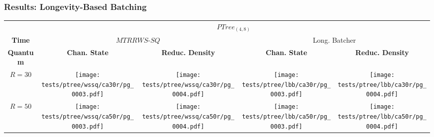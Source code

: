 \begin{slide}
\frametitle{Results: Longevity-Based Batching}
{\scriptsize
\begin{table}
    \centering
    \begin{tabular}{ccccc} & \multicolumn{4}{c}{ $PTree_{(4,8)}$ } \\ \cline{2-5}
    \multicolumn{1}{c}{\textbf{Time}} & \multicolumn{2}{c}{ $MTRRWS$-$SQ$ } & \multicolumn{2}{c}{ Long. Batcher} \\ \cline{2-5}
    \multicolumn{1}{c|}{\textbf{Quantum}} & \textbf{Chan. State} & \multicolumn{1}{c|}{\textbf{Reduc. Density}} 
                                                & \textbf{Chan. State} & \multicolumn{1}{c|}{\textbf{Reduc. Density}} \\ \cline{1-5}
    \multicolumn{1}{c|}{$R=30$} &  \multicolumn{1}{c}{\texttt{[image: tests/ptree/wssq/ca30r/pg\_0003.pdf]}} &
                                   \multicolumn{1}{c|}{\texttt{[image: tests/ptree/wssq/ca30r/pg\_0004.pdf]}} &
                                   \multicolumn{1}{c}{\texttt{[image: tests/ptree/lbb/ca30r/pg\_0003.pdf]}} &
                                   \multicolumn{1}{c|}{\texttt{[image: tests/ptree/lbb/ca30r/pg\_0004.pdf]}} \\ \cline{1-5}


    \multicolumn{1}{c|}{$R=50$} &  \multicolumn{1}{c}{\texttt{[image: tests/ptree/wssq/ca50r/pg\_0003.pdf]}} &
                                   \multicolumn{1}{c|}{\texttt{[image: tests/ptree/wssq/ca50r/pg\_0004.pdf]}} &
                                   \multicolumn{1}{c}{\texttt{[image: tests/ptree/lbb/ca50r/pg\_0003.pdf]}} &
                                   \multicolumn{1}{c|}{\texttt{[image: tests/ptree/lbb/ca50r/pg\_0004.pdf]}} \\ \cline{1-5}
    \end{tabular}
\end{table}
}
\end{slide}
